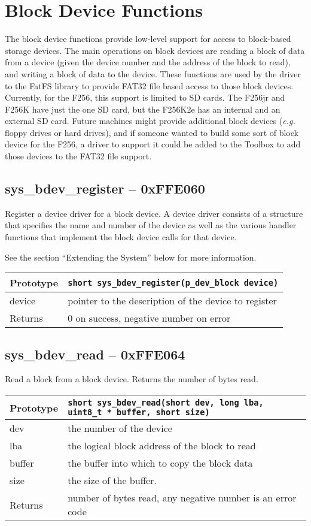 \section{Block Device Functions}
The block device functions provide low-level support for access to block-based storage devices.
The main operations on block devices are reading a block of data from a device (given the device number and the
address of the block to read), and writing a block of data to the device.
These functions are used by the driver to the FatFS library to provide FAT32 file based access to those
block devices.
Currently, for the F256, this support is limited to SD cards. The F256jr and F256K have just the one SD card,
but the F256K2e has an internal and an external SD card.
Future machines might provide additional block devices ({\it e.g.} floppy drives or hard drives), and if someone
wanted to build some sort of block device for the F256, a driver to support it could be added to the Toolbox to
add those devices to the FAT32 file support.

\subsection*{sys\_bdev\_register -- 0xFFE060}
Register a device driver for a block device. A device driver consists of a structure that specifies the name and number of the device as well as the various handler functions that implement the block device calls for that device.

See the section ``Extending the System'' below for more information.

\bigskip

\begin{tabular}{|l||l|} \hline
Prototype & \lstinline!short sys_bdev_register(p_dev_block device)! \\ \hline
device & pointer to the description of the device to register \\ \hline
Returns & 0 on success, negative number on error \\ \hline
\end{tabular}

\subsection*{sys\_bdev\_read -- 0xFFE064}
Read a block from a block device. Returns the number of bytes read.

\bigskip

\begin{tabular}{|l||l|} \hline
Prototype & \lstinline!short sys_bdev_read(short dev, long lba, uint8_t * buffer, short size)! \\ \hline
dev & the number of the device \\ \hline
lba & the logical block address of the block to read \\ \hline
buffer & the buffer into which to copy the block data \\ \hline
size & the size of the buffer. \\ \hline
Returns & number of bytes read, any negative number is an error code \\ \hline
\end{tabular}

